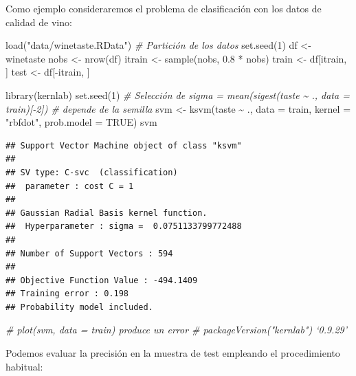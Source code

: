 \documentclass[
  spanish,
]{book}
\newenvironment{Shaded}{\begin{snugshade}}{\end{snugshade}}
\newcommand{\AttributeTok}[1]{\textcolor[rgb]{0.77,0.63,0.00}{#1}}
\newcommand{\CommentTok}[1]{\textcolor[rgb]{0.56,0.35,0.01}{\textit{#1}}}
\newcommand{\ConstantTok}[1]{\textcolor[rgb]{0.00,0.00,0.00}{#1}}
\newcommand{\DecValTok}[1]{\textcolor[rgb]{0.00,0.00,0.81}{#1}}
\newcommand{\FloatTok}[1]{\textcolor[rgb]{0.00,0.00,0.81}{#1}}
\newcommand{\FunctionTok}[1]{\textcolor[rgb]{0.00,0.00,0.00}{#1}}
\newcommand{\NormalTok}[1]{#1}
\newcommand{\OtherTok}[1]{\textcolor[rgb]{0.56,0.35,0.01}{#1}}
\newcommand{\SpecialCharTok}[1]{\textcolor[rgb]{0.00,0.00,0.00}{#1}}
\newcommand{\StringTok}[1]{\textcolor[rgb]{0.31,0.60,0.02}{#1}}
\theoremstyle{break}
\theoremstyle{definition}
\theoremstyle{definition}
\theoremstyle{definition}
\theoremstyle{definition}
\theoremstyle{remark}
\begin{document}
Como ejemplo consideraremos el problema de clasificación con los datos de calidad de vino:

\begin{Shaded}
\begin{Highlighting}[]
\FunctionTok{load}\NormalTok{(}\StringTok{"data/winetaste.RData"}\NormalTok{)}
\CommentTok{\# Partición de los datos}
\FunctionTok{set.seed}\NormalTok{(}\DecValTok{1}\NormalTok{)}
\NormalTok{df }\OtherTok{\textless{}{-}}\NormalTok{ winetaste}
\NormalTok{nobs }\OtherTok{\textless{}{-}} \FunctionTok{nrow}\NormalTok{(df)}
\NormalTok{itrain }\OtherTok{\textless{}{-}} \FunctionTok{sample}\NormalTok{(nobs, }\FloatTok{0.8} \SpecialCharTok{*}\NormalTok{ nobs)}
\NormalTok{train }\OtherTok{\textless{}{-}}\NormalTok{ df[itrain, ]}
\NormalTok{test }\OtherTok{\textless{}{-}}\NormalTok{ df[}\SpecialCharTok{{-}}\NormalTok{itrain, ]}


\FunctionTok{library}\NormalTok{(kernlab)}
\FunctionTok{set.seed}\NormalTok{(}\DecValTok{1}\NormalTok{) }
\CommentTok{\# Selección de sigma = mean(sigest(taste \textasciitilde{} ., data = train)[{-}2]) \# depende de la semilla}
\NormalTok{svm }\OtherTok{\textless{}{-}} \FunctionTok{ksvm}\NormalTok{(taste }\SpecialCharTok{\textasciitilde{}}\NormalTok{ ., }\AttributeTok{data =}\NormalTok{ train,}
            \AttributeTok{kernel =} \StringTok{"rbfdot"}\NormalTok{, }\AttributeTok{prob.model =} \ConstantTok{TRUE}\NormalTok{)}
\NormalTok{svm}
\end{Highlighting}
\end{Shaded}

\begin{verbatim}
## Support Vector Machine object of class "ksvm" 
## 
## SV type: C-svc  (classification) 
##  parameter : cost C = 1 
## 
## Gaussian Radial Basis kernel function. 
##  Hyperparameter : sigma =  0.0751133799772488 
## 
## Number of Support Vectors : 594 
## 
## Objective Function Value : -494.1409 
## Training error : 0.198 
## Probability model included.
\end{verbatim}

\begin{Shaded}
\begin{Highlighting}[]
\CommentTok{\# plot(svm, data = train) produce un error \# packageVersion("kernlab") ‘0.9.29’}
\end{Highlighting}
\end{Shaded}

Podemos evaluar la precisión en la muestra de test empleando el procedimiento habitual:
\end{document}
